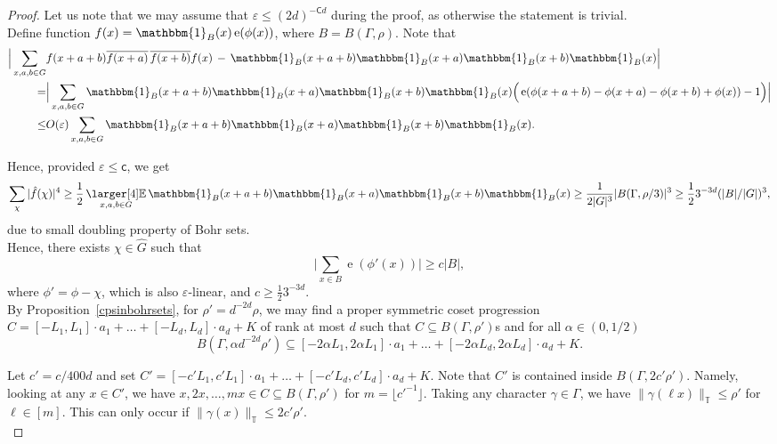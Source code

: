 \documentclass[a4paper,11pt]{article}
\numberwithin{theorem}{section}
\theoremstyle{definition}
\newcommand\id{\mathbbm{1}}
\newcommand{\on}[1]{
	\operatorname{#1}
}
\newcommand{\exx}{
  \mathop{
    \mathchoice{\vcenter{\hbox{\larger[4]$\mathbb{E}$}}}
               {\kern0pt\mathbb{E}}
               {\kern0pt\mathbb{E}}
               {\kern0pt\mathbb{E}}
  }\displaylimits
}
\newcommand{\blc}{\bm{\mathsf{C}}}
\newcommand{\bsc}{\bm{\mathsf{c}}}
\begin{document}
\begin{proof}
    Let us note that we may assume that $\varepsilon \leq (2d)^{-\blc d}$ during the proof, as otherwise the statement is trivial.\\

    Define function $f(x) = \id_{B}(x) \on{e}(\phi(x))$, where $B = B(\Gamma, \rho)$. Note that
    \begin{align*}\Big|\sum_{x,a,b\in G}& f(x + a + b) \overline{f(x + a)}\,\overline{f(x + b)} f(x)\, - \,\id_{B}(x + a + b) \id_{B}(x + a) \id_{B}(x + b) \id_{B}(x)\Big| \\
    = & \Big| \sum_{x,a,b\in G}\id_{B}(x + a + b)\id_{B}(x + a) \id_{B}(x + b) \id_{B}(x)\Big(\on{e}(\phi(x + a + b) - \phi(x + a) - \phi(x + b) + \phi(x))- 1\Big) \Big| \\
    \leq &O(\varepsilon) \sum_{x,a,b\in G}\id_{B}(x + a + b) \id_{B}(x + a) \id_{B}(x + b) \id_{B}(x).\end{align*}

    Hence, provided $\varepsilon \leq \bsc$, we get
    \[\sum_\chi |\hat{f}(\chi)|^4 \geq \frac{1}{2} \exx_{x,a,b\in G}\id_{B} (x + a + b) \id_{B}(x + a) \id_{B}(x + b) \id_{B}(x) \geq \frac{1}{2|G|^3}|B(\Gamma, \rho/3)|^3 \geq \frac{1}{2}3^{-3d}(|B|/|G|)^3,\]
    due to small doubling property of Bohr sets.\\

    Hence, there exists $\chi \in \hat{G}$ such that 
    \[\Big|\sum_{x \in B} \on{e}(\phi'(x))\Big| \geq c |B|,\]
    where $\phi' = \phi - \chi$, which is also $\varepsilon$-linear, and $c \geq \frac{1}{2}3^{-3d}$.\\

    By Proposition~\ref{cpsinbohrsets}, for $\rho' = d^{-2d}\rho$, we may find a proper symmetric coset progression $C = [-L_1, L_1] \cdot a_1 + \dots + [-L_d, L_d] \cdot a_d + K$ of rank at most $d$ such that $C \subseteq B(\Gamma, \rho')$s and for all $\alpha \in (0,1/2)$
    \begin{equation}B(\Gamma, \alpha d^{-2d} \rho')  \subseteq [-2\alpha L_1, 2\alpha L_1] \cdot a_1 + \dots + [-2\alpha L_d, 2\alpha L_d] \cdot a_d + K.\label{shringbohrcpcontainment}\end{equation}

    Let $c' = c/400d$ and set $C' = [- c'L_1, c' L_1] \cdot a_1 + \dots + [-c' L_d, c' L_d] \cdot a_d + K$. Note that $C'$ is contained inside $B(\Gamma, 2c'  \rho')$. Namely, looking at any $x \in C'$, we have $x, 2x, \dots, m x \in C \subseteq B(\Gamma, \rho')$ for $m = \lfloor  {c'}^{-1} \rfloor$. Taking any character $\gamma \in \Gamma$, we have $\|\gamma(\ell x)\|_{\mathbb{T}} \leq \rho'$ for $\ell \in [m]$. This can only occur if $\|\gamma(x)\|_{\mathbb{T}} \leq 2c' \rho'$.\\ 
       

\end{proof}
\end{document}
